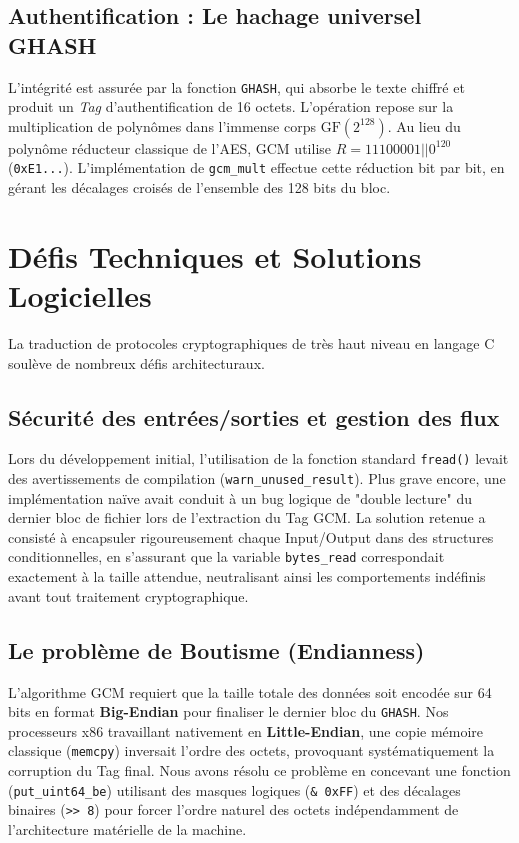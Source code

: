 \documentclass[12pt,a4paper]{article}
\begin{document}
\subsection{Authentification : Le hachage universel GHASH}
L'intégrité est assurée par la fonction \texttt{GHASH}, qui absorbe le texte chiffré et produit un \textit{Tag} d'authentification de 16 octets. L'opération repose sur la multiplication de polynômes dans l'immense corps $\mathrm{GF}(2^{128})$. Au lieu du polynôme réducteur classique de l'AES, GCM utilise $R = 11100001 || 0^{120}$ (\texttt{0xE1...}). L'implémentation de \texttt{gcm\_mult} effectue cette réduction bit par bit, en gérant les décalages croisés de l'ensemble des 128 bits du bloc.

\section{Défis Techniques et Solutions Logicielles}

La traduction de protocoles cryptographiques de très haut niveau en langage C soulève de nombreux défis architecturaux.

\subsection{Sécurité des entrées/sorties et gestion des flux}
Lors du développement initial, l'utilisation de la fonction standard \texttt{fread()} levait des avertissements de compilation (\texttt{warn\_unused\_result}). Plus grave encore, une implémentation naïve avait conduit à un bug logique de "double lecture" du dernier bloc de fichier lors de l'extraction du Tag GCM. La solution retenue a consisté à encapsuler rigoureusement chaque Input/Output dans des structures conditionnelles, en s'assurant que la variable \texttt{bytes\_read} correspondait exactement à la taille attendue, neutralisant ainsi les comportements indéfinis avant tout traitement cryptographique.

\subsection{Le problème de Boutisme (Endianness)}
L'algorithme GCM requiert que la taille totale des données soit encodée sur 64 bits en format \textbf{Big-Endian} pour finaliser le dernier bloc du \texttt{GHASH}. Nos processeurs x86 travaillant nativement en \textbf{Little-Endian}, une copie mémoire classique (\texttt{memcpy}) inversait l'ordre des octets, provoquant systématiquement la corruption du Tag final. Nous avons résolu ce problème en concevant une fonction (\texttt{put\_uint64\_be}) utilisant des masques logiques (\verb|& 0xFF|) et des décalages binaires (\verb|>> 8|) pour forcer l'ordre naturel des octets indépendamment de l'architecture matérielle de la machine.
\end{document}
